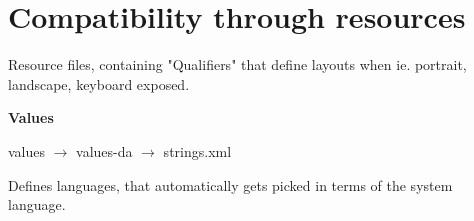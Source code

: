 \section{Compatibility through resources}
\begin{flushleft}
Resource files, containing "Qualifiers" that define layouts when ie. portrait, landscape, keyboard exposed.

\textbf{Values}

values $\rightarrow$ values-da $\rightarrow$ strings.xml

Defines languages, that automatically gets picked in terms of the system language.
\end{flushleft}
